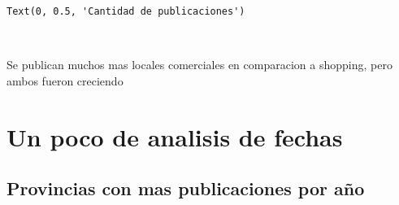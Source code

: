 \documentclass[11pt]{article}
\newcommand{\prompt}[4]{
        \llap{{\color{#2}[#3]: #4}}\vspace{-1.25em}
    }
\begin{document}
            \begin{tcolorbox}[breakable, boxrule=.5pt, size=fbox, pad at break*=1mm, opacityfill=0]
\prompt{Out}{outcolor}{519}{\hspace{3.5pt}}
\begin{Verbatim}[commandchars=\\\{\}]
Text(0, 0.5, 'Cantidad de publicaciones')
\end{Verbatim}
\end{tcolorbox}
        
    \begin{center}
    \end{center}
    { \hspace*{\fill} \\}
    
    Se publican muchos mas locales comerciales en comparacion a shopping,
pero ambos fueron creciendo

    \section{Un poco de analisis de
fechas}\label{un-poco-de-analisis-de-fechas}

    \subsection{Provincias con mas publicaciones por
año}\label{provincias-con-mas-publicaciones-por-auxf1o}
\end{document}
